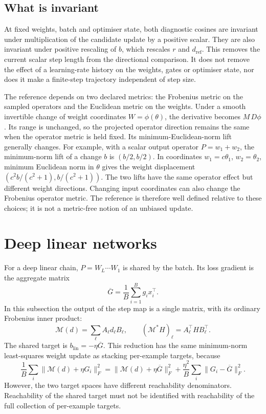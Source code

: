 \documentclass{article}
\theoremstyle{definition}
\theoremstyle{remark}
\begin{document}
\subsection{What is invariant}

At fixed weights, batch and optimiser state, both diagnostic cosines are invariant under multiplication of the candidate update by a positive scalar. They are also invariant under positive rescaling of $b$, which rescales $r$ and $d_{\mathrm{ref}}$. This removes the current scalar step length from the directional comparison. It does not remove the effect of a learning-rate history on the weights, gates or optimiser state, nor does it make a finite-step trajectory independent of step size.

The reference depends on two declared metrics: the Frobenius metric on the sampled operators and the Euclidean metric on the weights. Under a smooth invertible change of weight coordinates $W=\phi(\theta)$, the derivative becomes $M\,D\phi$. Its range is unchanged, so the projected operator direction remains the same when the operator metric is held fixed. Its minimum-Euclidean-norm lift generally changes. For example, with a scalar output operator $P=w_1+w_2$, the minimum-norm lift of a change $b$ is $(b/2,b/2)$. In coordinates $w_1=c\theta_1$, $w_2=\theta_2$, minimum Euclidean norm in $\theta$ gives the weight displacement $(c^2b/(c^2+1),b/(c^2+1))$. The two lifts have the same operator effect but different weight directions. Changing input coordinates can also change the Frobenius operator metric. The reference is therefore well defined relative to these choices; it is not a metric-free notion of an unbiased update.

\section{Deep linear networks}
\label{app:linear}

For a deep linear chain, $P=W_L\cdots W_1$ is shared by the batch. Its loss gradient is the aggregate matrix
\begin{equation}
 \overline G=\frac1B\sum_{i=1}^B g_i x_i^\top.
\end{equation}
In this subsection the output of the step map is a single matrix, with its ordinary Frobenius inner product:
\begin{equation}
 \mathcal M(d)=\sum_\ell A_\ell d_\ell B_\ell,
 \qquad
 (\mathcal M^*H)_\ell=A_\ell^\top H B_\ell^\top.
\end{equation}
The shared target is $b_{\mathrm{lin}}=-\eta\overline G$. This reduction has the same minimum-norm least-squares weight update as stacking per-example targets, because
\begin{equation}
 \frac1B\sum_i\|\mathcal M(d)+\eta G_i\|_F^2
 =\|\mathcal M(d)+\eta\overline G\|_F^2
   +\frac{\eta^2}{B}\sum_i\|G_i-\overline G\|_F^2.
\end{equation}
However, the two target spaces have different reachability denominators. Reachability of the shared target must not be identified with reachability of the full collection of per-example targets.
\end{document}
